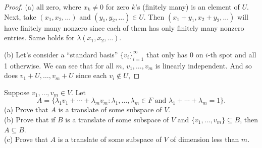 \documentclass{extarticle}
\begin{document}
\begin{proof}
(a) all zero, where \(x_k \neq 0\) for zero \(k\)'s (finitely many) is an element of \(U\). Next, take \((x_1, x_2, \ldots)\)
and \((y_1, y_2, \ldots) \in U\). Then \((x_1 + y_1, x_2 + y_2, \ldots)\) will have finitely many nonzero
since each of them has only finitely many nonzero entries. Same holds for \(\lambda(x_1, x_2, \ldots)\). 

(b) Let's consider a ``standard basis'' \(\{v_i\}_{i=1}^\infty\) that only has 0 on \(i\)-th spot and all 1 otherwise. 
We can see that for all \(m\), \(v_1, \ldots, v_m\) is linearly independent. And so does \(v_1 + U, \ldots, 
v_m + U\) since each \(v_i \notin U\), 

\end{proof}

\begin{problem}{12}
    Suppose \(v_1, \ldots, v_m \in V\). Let 
    \[A = \{\lambda_1 v_1 + \cdots + \lambda_m v_m \colon \lambda_1, \ldots, \lambda_m \in F \text{ and }
    \lambda_1 + \cdots + \lambda_m = 1\}.\]
    (a) Prove that \(A\) is a translate of some subspace of \(V\). \\ 
    (b) Prove that if \(B\) is a translate of some subspace of \(V\) and \(\{v_1, \ldots, v_m\} \subseteq B\), 
    then \(A \subseteq B\). \\ 
    (c) Prove that \(A\) is a translate of some subspace of \(V\) of dimension less than \(m\). 
\end{problem}
\end{document}
